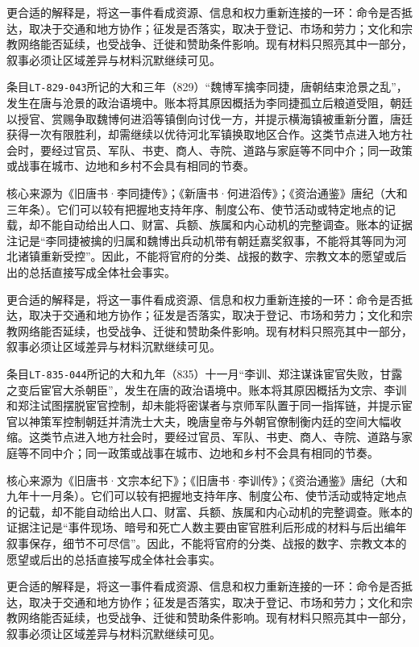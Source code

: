 更合适的解释是，将这一事件看成资源、信息和权力重新连接的一环：命令是否抵达，取决于交通和地方协作；征发是否落实，取决于登记、市场和劳力；文化和宗教网络能否延续，也受战争、迁徙和赞助条件影响。现有材料只照亮其中一部分，叙事必须让区域差异与材料沉默继续可见。

条目\texttt{LT-829-043}所记的大和三年（829）“魏博军擒李同捷，唐朝结束沧景之乱”，发生在唐与沧景的政治语境中。账本将其原因概括为李同捷孤立后粮道受阻，朝廷以授官、赏赐争取魏博何进滔等镇倒向讨伐一方，并提示横海镇被重新分置，唐廷获得一次有限胜利，却需继续以优待河北军镇换取地区合作。这类节点进入地方社会时，要经过官员、军队、书吏、商人、寺院、道路与家庭等不同中介；同一政策或战事在城市、边地和乡村不会具有相同的节奏。

核心来源为《旧唐书·李同捷传》；《新唐书·何进滔传》；《资治通鉴》唐纪（大和三年条）。它们可以较有把握地支持年序、制度公布、使节活动或特定地点的记载，却不能自动给出人口、财富、兵额、族属和内心动机的完整调查。账本的证据注记是“李同捷被擒的归属和魏博出兵动机带有朝廷嘉奖叙事，不能将其等同为河北诸镇重新受控”。因此，不能将官府的分类、战报的数字、宗教文本的愿望或后出的总括直接写成全体社会事实。

更合适的解释是，将这一事件看成资源、信息和权力重新连接的一环：命令是否抵达，取决于交通和地方协作；征发是否落实，取决于登记、市场和劳力；文化和宗教网络能否延续，也受战争、迁徙和赞助条件影响。现有材料只照亮其中一部分，叙事必须让区域差异与材料沉默继续可见。

条目\texttt{LT-835-044}所记的大和九年（835）十一月“李训、郑注谋诛宦官失败，甘露之变后宦官大杀朝臣”，发生在唐的政治语境中。账本将其原因概括为文宗、李训和郑注试图摆脱宦官控制，却未能将密谋者与京师军队置于同一指挥链，并提示宦官以神策军控制朝廷并清洗士大夫，晚唐皇帝与外朝官僚制衡内廷的空间大幅收缩。这类节点进入地方社会时，要经过官员、军队、书吏、商人、寺院、道路与家庭等不同中介；同一政策或战事在城市、边地和乡村不会具有相同的节奏。

核心来源为《旧唐书·文宗本纪下》；《旧唐书·李训传》；《资治通鉴》唐纪（大和九年十一月条）。它们可以较有把握地支持年序、制度公布、使节活动或特定地点的记载，却不能自动给出人口、财富、兵额、族属和内心动机的完整调查。账本的证据注记是“事件现场、暗号和死亡人数主要由宦官胜利后形成的材料与后出编年叙事保存，细节不可尽信”。因此，不能将官府的分类、战报的数字、宗教文本的愿望或后出的总括直接写成全体社会事实。

更合适的解释是，将这一事件看成资源、信息和权力重新连接的一环：命令是否抵达，取决于交通和地方协作；征发是否落实，取决于登记、市场和劳力；文化和宗教网络能否延续，也受战争、迁徙和赞助条件影响。现有材料只照亮其中一部分，叙事必须让区域差异与材料沉默继续可见。

